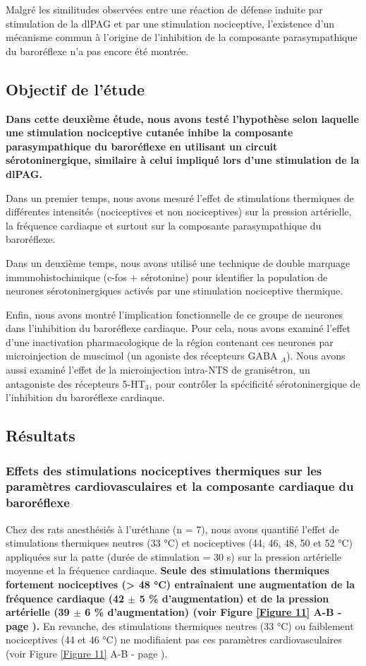 \documentclass[a4paper,12pt,twoside]{report}
\begin{document}
Malgré les similitudes observées entre une réaction de défense induite par stimulation de la dlPAG et par une stimulation nociceptive, l'existence d'un mécanisme commun à l'origine de l'inhibition de la composante parasympathique du baroréflexe n’a pas encore été montrée.

\subsection{Objectif de l’étude}

\textbf{Dans cette deuxième étude, nous avons testé l’hypothèse selon laquelle une stimulation nociceptive cutanée inhibe la composante parasympathique du baroréflexe en utilisant un circuit sérotoninergique, similaire à celui impliqué lors d’une stimulation de la dlPAG.}

Dans un premier temps, nous avons mesuré l’effet de stimulations thermiques de différentes intensités (nociceptives et non nociceptives) sur la pression artérielle, la fréquence cardiaque et surtout sur la composante parasympathique du baroréflexe. 

Dans un deuxième temps, nous avons utilisé une technique de double marquage immunohistochimique (c-fos + sérotonine) pour identifier la population de neurones sérotoninergiques activés par une stimulation nociceptive thermique.

Enfin, nous avons montré l’implication fonctionnelle de ce groupe de neurones dans l'inhibition du baroréflexe cardiaque. Pour cela, nous avons examiné l’effet d’une inactivation pharmacologique de la région contenant ces neurones par microinjection de muscimol (un agoniste des récepteurs GABA $_{A}$). Nous avons aussi examiné l'effet de la microinjection intra-NTS de granisétron, un antagoniste des récepteurs 5-HT$_{3}$, pour contrôler la spécificité sérotoninergique de l'inhibition du baroréflexe cardiaque.

\subsection{Résultats}

\subsubsection{Effets des stimulations nociceptives thermiques sur les paramètres cardiovasculaires et la composante cardiaque du baroréflexe}

Chez des rats anesthésiés à l’uréthane (n = 7), nous avons quantifié l’effet de stimulations thermiques neutres (33 °C) et nociceptives (44, 46, 48, 50 et 52 °C) appliquées sur la patte (durée de stimulation = 30 s) sur la pression artérielle moyenne et la fréquence cardiaque. \textbf{Seule des stimulations thermiques fortement nociceptives (> 48 °C) entraînaient une augmentation de la fréquence cardiaque (42 $\pm$ 5 \% d’augmentation) et de la pression artérielle (39 $\pm$ 6 \% d’augmentation) (voir Figure \ref{Figure 11} A-B - page \pageref{Figure 11}).} En revanche, des stimulations thermiques neutres (33 °C) ou faiblement nociceptives (44 et 46 °C) ne modifiaient pas ces paramètres cardiovasculaires (voir Figure \ref{Figure 11} A-B - page \pageref{Figure 11}).
\end{document}

